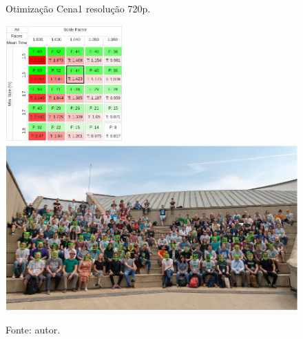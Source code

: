\begin{figure}[h]
    \centering
    \caption[Otimização Cena1 resolução 720p.]{Otimização Cena1 resolução 720p.}
    \includegraphics[width=0.4\textwidth]{Cap4_Experimentos_Realizados/Figures/cena1_param_720p_matriz.jpg}
    \includegraphics[width=1.0\textwidth]{Cap4_Experimentos_Realizados/Figures/cena1_param_720p_faces.jpg}
    \caption*{Fonte: autor.}
    \label{fig:otimizacaoCena1_720p}
\end{figure}
